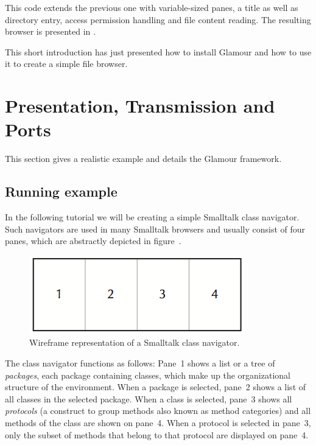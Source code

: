 \documentclass[a4paper,10pt,twoside]{book}
\begin{document}
This code extends the previous one with variable-sized panes, a title
as well as directory entry, access permission handling and
file content reading. The resulting browser is presented in
.

This short introduction has just presented how to install Glamour and how to use
it to create a simple file browser. 

\section{Presentation, Transmission and Ports}

This section gives a realistic example and details the Glamour framework.

\subsection{Running example}
\label{sec:tutorial/getting_started}

In the following tutorial we will be creating a simple Smalltalk class
navigator. Such navigators are used in many Smalltalk browsers and
usually consist of four panes, which are abstractly depicted in
figure~.

\begin{figure}[htbp]
\centerline{\includegraphics[width=\linewidth]{classnavigator_wireframe.png}}
\caption{Wireframe representation of a Smalltalk class navigator.}
\label{fig:classnavigator_wireframe}
\end{figure}

The class navigator functions as follows: Pane~1 shows a list or a
tree of \emph{packages}, each package containing classes, which make up the
organizational structure of the environment. When a package is
selected, pane~2 shows a list of all classes in the selected
package. When a class is selected, pane~3 shows all \emph{protocols}
(a construct to group methods also known as method categories) and all
methods of the class are shown on pane~4. When a protocol is
selected in pane~3, only the subset of methods that belong to that
protocol are displayed on pane~4.
\end{document}
